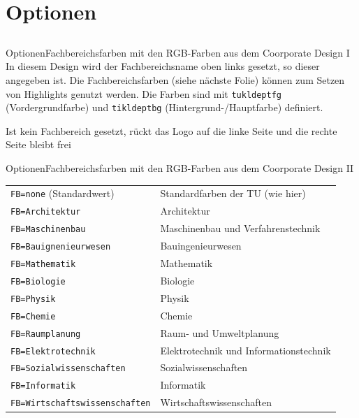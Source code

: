 \documentclass[german,10pt,xcolor=colortbl,compress
]{beamer}
\begin{document}
	\section{Optionen}
	\subsection*{}
	\begin{frame}{Optionen}{Fachbereichsfarben mit den RGB-Farben aus dem Coorporate Design I}
		In diesem Design wird der Fachbereichsname oben links gesetzt, so dieser angegeben ist. Die Fachbereichsfarben (siehe nächste Folie) können zum Setzen von Highlights genutzt werden. Die Farben sind mit \lstinline!tukldeptfg! (Vordergrundfarbe) und \lstinline!tikldeptbg! (Hintergrund-/Hauptfarbe) definiert.
		
		Ist kein Fachbereich gesetzt, rückt das Logo auf die linke Seite und die rechte Seite bleibt frei
	\end{frame}
	\begin{frame}{Optionen}{Fachbereichsfarben mit den RGB-Farben aus dem Coorporate Design II}
				\begin{tabular}{ll}
					\toprule
					\lstinline|FB=none| (Standardwert)& Standardfarben der TU (wie hier)\\
					\lstinline|FB=Architektur| & \colorbox{tuklarchitektur}{\color{white}Architektur}\\
					\lstinline|FB=Maschinenbau| & \colorbox{tuklmaschinenbau}{\color{white}Maschinenbau und Verfahrenstechnik}\\
					\lstinline|FB=Bauignenieurwesen| & \colorbox{tuklbauingenieurwesen}{\color{white}Bauingenieurwesen}\\
					\lstinline|FB=Mathematik| & \colorbox{tuklmathematik}{\color{black}Mathematik}\\
					\lstinline|FB=Biologie| & \colorbox{tuklbiologie}{\color{white}Biologie}\\
					\lstinline|FB=Physik| & \colorbox{tuklphysik}{\color{white}Physik}\\
					\lstinline|FB=Chemie| & \colorbox{tuklchemie}{\color{white}Chemie}\\
					\lstinline|FB=Raumplanung| & \colorbox{tuklraumplanung}{\color{white}Raum- und Umweltplanung}\\
					\lstinline|FB=Elektrotechnik| & \colorbox{tuklelektrotechnik}{\color{white}Elektrotechnik und Informationstechnik}\\
					\lstinline|FB=Sozialwissenschaften| & \colorbox{tuklsozialwissenschaften}{\color{white}Sozialwissenschaften}\\
					\lstinline|FB=Informatik| & \colorbox{tuklinformatik}{\color{white}Informatik}\\
					\lstinline|FB=Wirtschaftswissenschaften| & \colorbox{tuklwirtschaftswissenschaften}{\color{white}Wirtschaftswissenschaften}\\
					\bottomrule
				\end{tabular}
	\end{frame}
\end{document}
